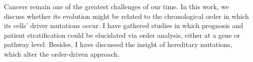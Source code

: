Cancers remain one of the greatest challenges of our time. In this work, we discuss whether its evolution might be related to the chronological order in which its cells' driver mutations occur. I have gathered studies in which prognosis and patient stratification could be elucidated via order analysis, either at a gene or pathway level. Besides, I have discussed the insight of hereditary mutations, which alter the order-driven approach.